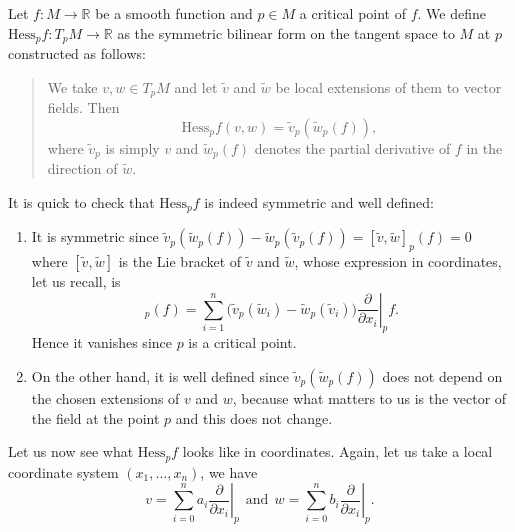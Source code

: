 \begin{definition}
    Let $f:M\to \mathbb{R}$ be a smooth function and $p\in M$ a critical point of $f$. We define $\textrm{Hess}_{p}f: T_{p}M\to \mathbb{R}$ as the symmetric bilinear form on the tangent space to $M$ at $p$ constructed as follows: %
    \begin{quote}
        We take $v,w\in T_{p}M$ and let $\tilde{v}$ and $\tilde{w}$ be local extensions of them to vector fields. Then
        \begin{equation*}
            \text{Hess}_{p}f(v,w)=\tilde{v}_{p}(\tilde{w}_{p}(f)),
        \end{equation*}
        where $\tilde{v}_{p}$ is simply $v$ and $\tilde{w}_{p}(f)$ denotes the partial derivative of $f$ in the direction of $\tilde{w}$.
    \end{quote}
\end{definition}
\bigskip
\begin{remark}
    It is quick to check that $\text{Hess}_{p}f$ is indeed symmetric and well defined:

    \begin{enumerate}[label=(\roman*)]
        \item It is symmetric since $\tilde{v}_{p}(\tilde{w}_{p}(f)) - \tilde{w}_{p}(\tilde{v}_{p}(f)) = [\tilde{v},\tilde{w}]_{p}(f) = 0$ where $[\tilde{v},\tilde{w}]$ is the Lie bracket of $\tilde{v}$ and $\tilde{w}$, whose expression in coordinates, let us recall, is
        \begin{equation*}
            [\tilde{v},\tilde{w}]_{p}(f)=\sum_{i=1}^n \big( \tilde{v}_p(\tilde{w}_{i}) - \tilde{w}_p(\tilde{v}_{i}) \big) \left. \frac{\partial}{\partial x_{i}}\right|_p f.
        \end{equation*}
        Hence it vanishes since $p$ is a critical point.

        \item On the other hand, it is well defined since $\tilde{v}_{p}(\tilde{w}_{p}(f))$ does not depend on the chosen extensions of $v$ and $w$, because what matters to us is the vector of the field at the point $p$ and this does not change.
    \end{enumerate}
\end{remark}
\bigskip

Let us now see what $\text{Hess}_pf$ looks like in coordinates. Again, let us take a local coordinate system $(x_{1}, \dots ,x_{n})$, we have
\begin{equation*}
    v=\sum_{i=0}^n a_i \left.\frac{\partial}{\partial x_i}\right|_p ~~\text{and}~~ w=\sum_{i=0}^n b_i \left.\frac{\partial}{\partial x_i}\right|_p . %
\end{equation*}
\medskip

